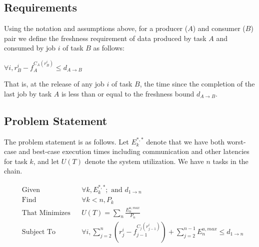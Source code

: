 \subsection{Requirements}

Using the notation and assumptions above, for a producer ($A$) and consumer ($B$) pair we define the freshness requirement of data produced by task $A$ and consumed by job $i$ of task $B$ as follows:
\begin{center}
	$\forall i, r^i_B - f_A^{C_A(r^i_B)} \leq d_{A \to B}$
\end{center}
That is, at the release of any job $i$ of task $B$, the time since the completion of the last job by task $A$ is less than or equal to the freshness bound $d_{A \to B}$.


\subsection{Problem Statement}

The problem statement is as follows. Let $E^{*,*}_k$ denote that we have both worst-case and best-case execution times including communication and other latencies for task $k$, and let $U(T)$ denote the system utilization. We have $n$ tasks in the chain.

\iffalse
\begin{equation*}
	\begin{aligned}
		& \text{Given}
		& & E^{*,*}_A, E^{*,*}_B, P_B, \text{ and } d_{A \to B} \\
		& \text{Find}
		& & P_A \\
		& \text{That Minimizes}
		& & U(T) = \sum_i \frac{E_i^{u,max}}{P_i}\\
		& \text{Subject To}
		& & \forall i, r^i_B - f_A^{C_A(r^i_B)} \leq d_{A \to B}
	\end{aligned}
\end{equation*}
\fi

\begin{equation*}
	\begin{aligned}
		& \text{Given}
		& & \forall k, E^{*,*}_k; \text{ and } d_{1 \to n} \\
		& \text{Find}
		& & \forall k < n, P_k \\
		& \text{That Minimizes}
		& & U(T) = \sum_n \frac{E_n^{u,max}}{P_n}\\
		& \text{Subject To}
		& & \forall i, \sum_{j=2}^{n} (r^i_j - f_{j-1}^{C_j(r^i_{j-1})}) + \sum_{j=2}^{n-1} E_n^{u,max} \leq d_{1 \to n}
	\end{aligned}
\end{equation*}

